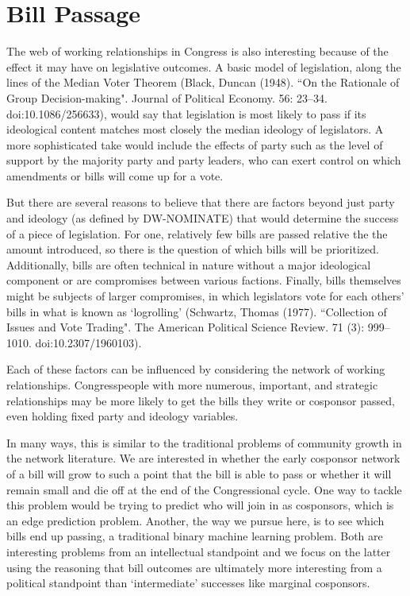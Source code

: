 \section{Bill Passage}

The web of working relationships in Congress is also interesting because of the effect it may have on legislative outcomes. A basic model of legislation, along the lines of the Median Voter Theorem (Black, Duncan (1948). ``On the Rationale of Group Decision-making". Journal of Political Economy. 56: 23–34. doi:10.1086/256633), would say that legislation is most likely to pass if its ideological content matches most closely the median ideology of legislators. A more sophisticated take would include the effects of party such as the level of support by the majority party and party leaders, who can exert control on which amendments or bills will come up for a vote.

But there are several reasons to believe that there are factors beyond just party and ideology (as defined by DW-NOMINATE) that would determine the success of a piece of legislation. For one, relatively few bills are passed relative the the amount introduced, so there is the question of which bills will be prioritized. Additionally, bills are often technical in nature without a major ideological component or are compromises between various factions. Finally, bills themselves might be subjects of larger compromises, in which legislators vote for each others' bills in what is known as `logrolling' (Schwartz, Thomas (1977). ``Collection of Issues and Vote Trading". The American Political Science Review. 71 (3): 999–1010. doi:10.2307/1960103). 

Each of these factors can be influenced by considering the network of working relationships. Congresspeople with more numerous, important, and strategic relationships may be more likely to get the bills they write or cosponsor passed, even holding fixed party and ideology variables.

In many ways, this is similar to the traditional problems of community growth in the network literature. We are interested in whether the early cosponsor network of a bill will grow to such a point that the bill is able to pass or whether it will remain small and die off at the end of the Congressional cycle. One way to tackle this problem would be trying to predict who will join in as cosponsors, which is an edge prediction problem. Another, the way we pursue here, is to see which bills end up passing, a traditional binary machine learning problem. Both are interesting problems from an intellectual standpoint and we focus on the latter using the reasoning that bill outcomes are ultimately more interesting from a political standpoint than `intermediate' successes like marginal cosponsors.

